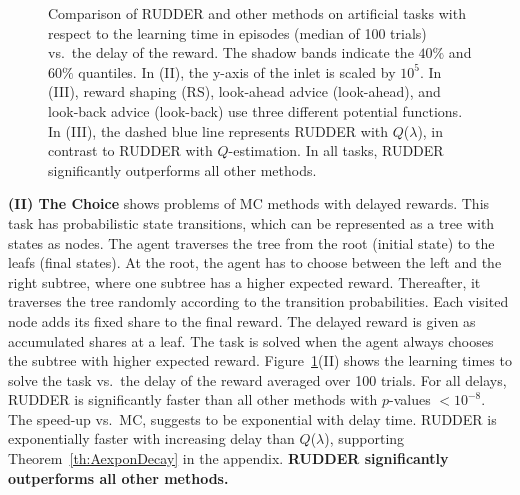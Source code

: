 \documentclass{article}
\newcommand{\figpath}{figures/}
\begin{document}
\begin{figure}[!t]\centering \resizebox{\linewidth}{!}{}
\caption{Comparison of RUDDER and other methods on artificial tasks 
with respect to the learning time in episodes (median of 100 trials)
vs.\ the delay of the reward.
The shadow bands indicate the $40\%$ and $60\%$ quantiles.
In (II), the y-axis of the inlet is scaled by $10^{5}$.
In (III), reward shaping (RS), 
look-ahead advice (look-ahead), 
and look-back advice (look-back) use three different potential functions.
In (III), the dashed blue line
represents RUDDER with $Q$($\lambda$), 
in contrast to RUDDER with $Q$-estimation. 
In all tasks, RUDDER significantly outperforms all other methods.\label{fig:test}}\end{figure}

{\bf (II) The Choice}
shows problems of MC methods with delayed rewards.
This task has probabilistic state transitions, which
can be represented as a tree with states as nodes.
The agent traverses the tree from the root (initial state) 
to the leafs (final states).
At the root, the agent has to choose between 
the left and the right subtree,
where one subtree has a higher expected reward.
Thereafter, it traverses the tree randomly 
according to the transition probabilities. 
Each visited node adds its fixed share to the final reward. 
The delayed reward is given as accumulated shares at a leaf.
The task is solved when 
the agent always chooses the subtree with higher expected reward.
Figure~\ref{fig:test}(II) shows the 
learning times 
to solve the task vs.\ the delay of the reward averaged over 100 trials.
For all delays, RUDDER is significantly faster than all other methods
with $p$-values $<10^{-8}$.
The speed-up vs.\ MC, 
suggests to be exponential with delay time.
RUDDER is exponentially faster with increasing delay 
than $Q$($\lambda$), 
supporting Theorem~\ref{th:AexponDecay} in the appendix. 
{\bf RUDDER significantly outperforms all other methods.}
\end{document}
